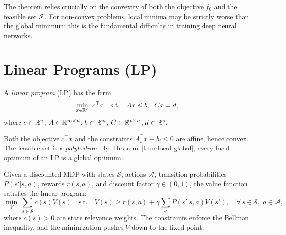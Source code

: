 \documentclass[11pt,a4paper]{article}
\begin{document}
\begin{warning}
The theorem relies crucially on the convexity of both the objective $f_0$ and
the feasible set $\mathcal{F}$. For non-convex problems, local minima may be
strictly worse than the global minimum; this is the fundamental difficulty in
training deep neural networks.
\end{warning}


\section{Linear Programs (LP)}\label{sec:lp}

\begin{definition}\label{def:lp}
A \emph{linear program} (LP) has the form
\begin{equation}\label{eq:lp}
  \min_{x \in \mathbb{R}^n} \; c^\top x \quad
  \text{s.t.} \quad Ax \le b, \;\; Cx = d,
\end{equation}
where $c \in \mathbb{R}^n$, $A \in \mathbb{R}^{m \times n}$, $b \in \mathbb{R}^m$,
$C \in \mathbb{R}^{p \times n}$, $d \in \mathbb{R}^p$.
\end{definition}

\begin{remark}\label{rem:lp-convex}
Both the objective $c^\top x$ and the constraints $A_i^\top x - b_i \le 0$
are affine, hence convex. The feasible set is a \emph{polyhedron}. By
Theorem~\ref{thm:local-global}, every local optimum of an LP is a global
optimum.
\end{remark}

\begin{example}\label{ex:lp-mdp}
Given a discounted MDP with states $\mathcal{S}$, actions $\mathcal{A}$,
transition probabilities $P(s'|s,a)$, rewards $r(s,a)$, and discount factor
$\gamma \in (0,1)$, the value function satisfies the linear program:
\[
  \min_{V} \; \sum_{s \in \mathcal{S}} c(s) V(s) \quad \text{s.t.} \quad
  V(s) \ge r(s,a) + \gamma \sum_{s'} P(s'|s,a) V(s'), \quad
  \forall\, s \in \mathcal{S}, \; a \in \mathcal{A},
\]
where $c(s) > 0$ are state relevance weights. The constraints enforce the
Bellman inequality, and the minimization pushes $V$ down to the fixed point.
\end{example}

\end{document}
